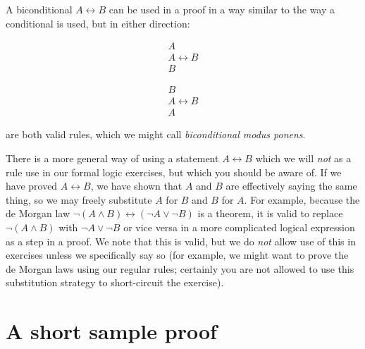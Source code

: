 \documentclass[12pt]{article}
\begin{document}
A biconditional $A \leftrightarrow B$ can be used in a proof in a way similar to the way a conditional is used, but in either direction:

$$\begin{array}{c}

A \\

A \leftrightarrow B \\ \hline

B

\end{array}$$

$$\begin{array}{c}

B \\

A \leftrightarrow B \\ \hline

A

\end{array}$$

are both valid rules, which we might call {\em biconditional modus ponens\/}.

There is a more general way of using a statement $A \leftrightarrow B$ which we will {\em not\/} as a rule use in our formal logic exercises, but which you should be aware of.
If we have proved $A \leftrightarrow B$, we have shown that $A$ and $B$ are effectively saying the same thing, so we may freely substitute $A$ for $B$ and $B$ for $A$.
For example, because the de Morgan law $\neg(A \wedge B) \leftrightarrow (\neg A \vee \neg B)$ is a theorem, it is valid to replace $\neg(A \wedge B)$ with $\neg A \vee \neg B$ or vice versa
in a more complicated logical expression as a step in a proof.  We note that this is valid, but we do {\em not\/} allow use of this in exercises unless we specifically say so (for example, we might want to prove the de Morgan laws using our regular rules;  certainly you are not allowed to use this substitution strategy to short-circuit the exercise).

\newpage

\section{A short sample proof}
\end{document}
